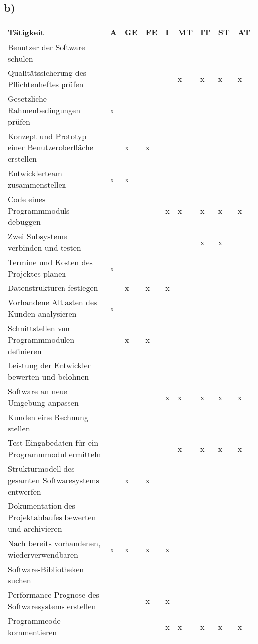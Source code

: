 \documentclass[a4paper,11pt]{scrartcl}
\begin{document}
	\subsection*{b)}
	\begin{table}[h!]
		\begin{tabular}{l|l|l|l|l|l|l|l|l}
		 \textbf{Tätigkeit} 										&A &GE&FE&I &MT&IT&ST&AT \\ 
		 \hline
		 Benutzer der Software schulen								&  &  &  &  &  &  &  &  \\
		 Qualitätssicherung des Pflichtenheftes prüfen				&  &  &  &  &x &x &x &x \\
		 Gesetzliche Rahmenbedingungen prüfen						&x &  &  &  &  &  &  &  \\
		 Konzept und Prototyp einer Benutzeroberfläche erstellen	&  &x &x &  &  &  &  &  \\
		 Entwicklerteam zusammenstellen								&x &x &  &  &  &  &  &  \\
		 Code eines Programmmoduls debuggen							&  &  &  &x &x &x &x &x \\
 		 Zwei Subsysteme verbinden und testen						&  &  &  &  &  &x &x &  \\
 		 Termine und Kosten des Projektes planen					&x &  &  &  &  &  &  &  \\
		 Datenstrukturen festlegen									&  &x &x &x &  &  &  &  \\
		 Vorhandene Altlasten des Kunden analysieren				&x &  &  &  &  &  &  &  \\
		 Schnittstellen von Programmmodulen definieren				&  &x &x &  &  &  &  &  \\
		 Leistung der Entwickler bewerten und belohnen				&  &  &  &  &  &  &  &  \\
		 Software an neue Umgebung anpassen							&  &  &  &x &x &x &x &x \\
		 Kunden eine Rechnung stellen								&  &  &  &  &  &  &  &  \\
		 Test-Eingabedaten für ein Programmmodul ermitteln			&  &  &  &  &x &x &x &x \\ 
		 Strukturmodell des gesamten Softwaresystems entwerfen		&  &x &x &  &  &  &  &  \\
		 Dokumentation des Projektablaufes bewerten und archivieren	&  &  &  &  &  &  &  &  \\
		 Nach bereits vorhandenen, wiederverwendbaren 				&x &x &x &x &  &  &  &  \\
		 	     Software-Bibliotheken suchen	&  &  &  &  &  &  &  &  \\ 	
		 Performance-Prognose des Softwaresystems erstellen			&  &  &x &x &  &  &  &  \\
		 Programmcode kommentieren									&  &  &  &x &x &x &x &x \\ 
		\end{tabular}
	\end{table}
\end{document}
